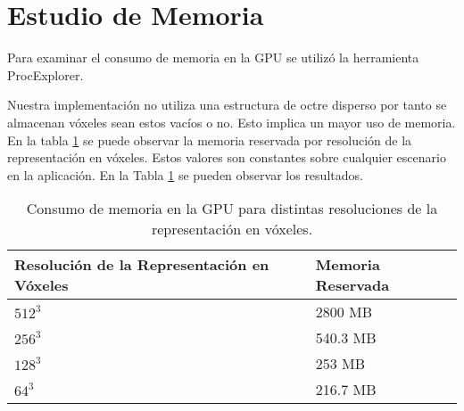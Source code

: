 \section{Estudio de Memoria}
Para examinar el consumo de memoria en la \ac{GPU} se utilizó la herramienta ProcExplorer.

Nuestra implementación no utiliza una estructura de octre disperso por tanto se almacenan vóxeles sean estos vacíos o no. Esto implica un mayor uso de memoria. En la tabla \ref{tab:memory} se puede observar la memoria reservada por resolución de la representación en vóxeles. Estos valores son constantes sobre cualquier escenario en la aplicación. En la Tabla \ref{tab:memory} se pueden observar los resultados.
\begin{table}[H]
	\centering
	\begin{tabular}{ll}
	Resolución de la Representación en Vóxeles & Memoria Reservada             \\ \hline
	\multicolumn{1}{|l|}{$512^3$}                  & \multicolumn{1}{l|}{2800 MB}  \\
	\multicolumn{1}{|l|}{$256^3$}                  & \multicolumn{1}{l|}{540.3 MB} \\
	\multicolumn{1}{|l|}{$128^3$}                  & \multicolumn{1}{l|}{253 MB}   \\
	\multicolumn{1}{|l|}{$64^3$}                   & \multicolumn{1}{l|}{216.7 MB} \\ \hline
	\end{tabular}
	\caption{Consumo de memoria en la \ac{GPU} para distintas resoluciones de la representación en vóxeles.}
	\label{tab:memory}
\end{table}

